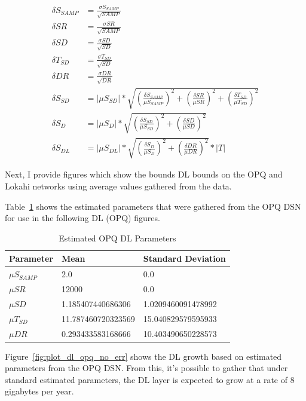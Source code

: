 \begin{align}
	\delta S_{SAMP} &= \frac{\sigma S_{SAMP}}{\sqrt{SAMP}} \label{eq:dl0} \\
	\delta SR &= \frac{\sigma SR}{\sqrt{SAMP}} \label{eq:dl1} \\
	\delta SD &= \frac{\sigma SD}{\sqrt{SD}} \label{eq:dl2} \\
	\delta T_{SD} &= \frac{\sigma T_{SD}}{\sqrt{SD}} \label{eq:dl3} \\
	\delta DR &= \frac{\sigma DR}{\sqrt{DR}} \label{eq:dl4} \\
	\delta S_{SD} &= |\mu S_{SD}| * \sqrt{(\frac{\delta S_{SAMP}}{\mu S_{SAMP}})^2 + (\frac{\delta SR}{\mu SR})^2 + (\frac{\delta T_{SD}}{\mu T_{SD}})^2} \label{eq:dl5} \\
	\delta S_{D} &= |\mu S_{D}| * \sqrt{(\frac{\delta S_{SD}}{\mu S_{SD}})^2 + (\frac{\delta SD}{\mu SD})^2} \label{eq:dl6} \\
	\delta S_{DL} &= |\mu S_{DL}| * \sqrt{(\frac{\delta S_{D}}{\mu S_{D}})^2 + (\frac{\delta DR}{\mu DR})^2} * |T| \label{eq:dl7}
\end{align}

Next, I provide figures which show the bounds DL bounds on the OPQ and Lokahi networks using average values gathered from the data.

Table~\ref{table:dl:opq} shows the estimated parameters that were gathered from the OPQ DSN for use in the following DL (OPQ) figures.

\begin{table}[H]
	\centering
	\caption{Estimated OPQ DL Parameters}
	\begin{tabularx}{\textwidth}{llX}
		\toprule
		\textbf{Parameter} & \textbf{Mean} & \textbf{Standard Deviation} \\
		\midrule
		$\mu S_{SAMP}$ & 2.0 & 0.0 \\
		$\mu SR$ & 12000 & 0.0 \\
		$\mu SD$ & 1.185407440686306 & 1.0209460091478992 \\
		$\mu T_{SD}$ & 11.787460720323569 & 15.040829579595933 \\
		$\mu DR$ & 0.293433583168666 & 10.403490650228573 \\
		\bottomrule
	\end{tabularx}
	\label{table:dl:opq}
\end{table}


Figure~\ref{fig:plot_dl_opq_no_err} shows the DL growth based on estimated parameters from the OPQ DSN\@. From this, it's possible to gather that under standard estimated parameters, the DL layer is expected to grow at a rate of 8 gigabytes per year.

